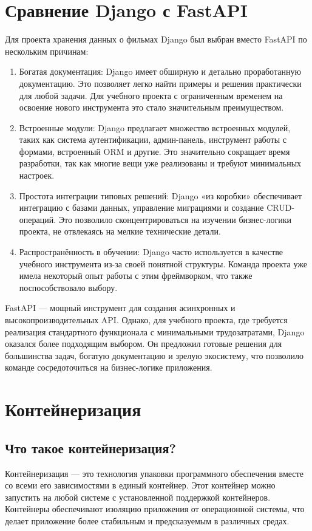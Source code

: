 \section{Сравнение Django с FastAPI}
Для проекта хранения данных о фильмах Django был выбран вместо FastAPI по нескольким причинам:

\begin{enumerate}
    \item Богатая документация: Django имеет обширную и детально проработанную документацию. Это позволяет легко найти примеры и решения практически для любой задачи. Для учебного проекта с ограниченным временем на освоение нового инструмента это стало значительным преимуществом.
    \item Встроенные модули: Django предлагает множество встроенных модулей, таких как система аутентификации, админ-панель, инструмент работы с формами, встроенный ORM и другие. Это значительно сокращает время разработки, так как многие вещи уже реализованы и требуют минимальных настроек.
    \item Простота интеграции типовых решений: Django «из коробки» обеспечивает интеграцию с базами данных, управление миграциями и создание CRUD-операций. Это позволило сконцентрироваться на изучении бизнес-логики проекта, не отвлекаясь на мелкие технические детали.
    \item Распространённость в обучении: Django часто используется в качестве учебного инструмента из-за своей понятной структуры. Команда проекта уже имела некоторый опыт работы с этим фреймворком, что также поспособствовало выбору.
\end{enumerate}


FastAPI — мощный инструмент для создания асинхронных и высокопроизводительных API. Однако, для учебного проекта, где требуется реализация стандартного функционала с минимальными трудозатратами, Django оказался более подходящим выбором. Он предложил готовые решения для большинства задач, богатую документацию и зрелую экосистему, что позволило команде сосредоточиться на бизнес-логике приложения.

\section{Контейнеризация}

\subsection*{Что такое контейнеризация?}
Контейнеризация — это технология упаковки программного обеспечения вместе со всеми его зависимостями в единый контейнер. Этот контейнер можно запустить на любой системе с установленной поддержкой контейнеров. Контейнеры обеспечивают изоляцию приложения от операционной системы, что делает приложение более стабильным и предсказуемым в различных средах.

